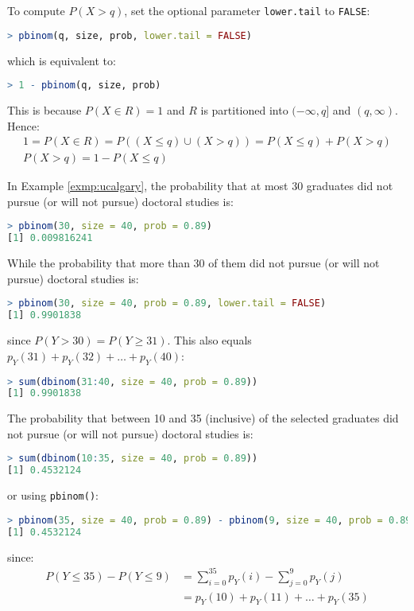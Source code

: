 To compute \( P(X > q) \), set the optional parameter \verb|lower.tail| to \verb|FALSE|:
\begin{lstlisting}[language=R]
> pbinom(q, size, prob, lower.tail = FALSE)
\end{lstlisting}
which is equivalent to:
\begin{lstlisting}[language=R]
> 1 - pbinom(q, size, prob)
\end{lstlisting}
This is because \( P(X \in R) = 1 \) and \( R \) is partitioned into \( (-\infty, q] \) and \( (q, \infty) \).
Hence:
\begin{gather*}
    1 = P(X \in R) = P((X \leq q) \cup (X > q)) = P(X \leq q) + P(X > q)\\
    P(X > q) = 1 - P(X \leq q)
\end{gather*}
\begin{exmp}
    In Example \autoref{exmp:ucalgary}, the probability that at most 30 graduates did not pursue (or will not pursue) doctoral studies is:
    \begin{lstlisting}[language=R]
> pbinom(30, size = 40, prob = 0.89)
[1] 0.009816241
    \end{lstlisting}
    While the probability that more than 30 of them did not pursue (or will not pursue) doctoral studies is:
    \begin{lstlisting}[language=R]
> pbinom(30, size = 40, prob = 0.89, lower.tail = FALSE)
[1] 0.9901838
    \end{lstlisting}
    since \( P(Y > 30) = P(Y \geq 31) \).
    This also equals \( p_{Y}(31) + p_{Y}(32) + \ldots + p_{Y}(40) \):
    \begin{lstlisting}[language=R]
> sum(dbinom(31:40, size = 40, prob = 0.89))
[1] 0.9901838
    \end{lstlisting}
    The probability that between 10 and 35 (inclusive) of the selected graduates did not pursue (or will not pursue) doctoral studies is:
    \begin{lstlisting}[language=R]
> sum(dbinom(10:35, size = 40, prob = 0.89))
[1] 0.4532124
    \end{lstlisting}
    or using \verb|pbinom()|:
    \begin{lstlisting}[language=R]
> pbinom(35, size = 40, prob = 0.89) - pbinom(9, size = 40, prob = 0.89)
[1] 0.4532124
    \end{lstlisting}
    since:
    \begin{align*}
        P(Y \leq 35) - P(Y \leq 9) &= \sum_{i = 0}^{35} p_{Y}(i) - \sum_{j = 0}^{9} p_{Y}(j)\\
        &= p_{Y}(10) + p_{Y}(11) + \ldots + p_{Y}(35)
    \end{align*}
\end{exmp}

